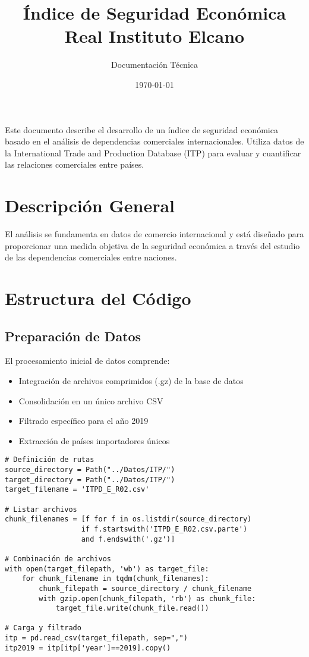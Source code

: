 \documentclass[11pt,a4paper]{article}
\title{\color{titlecolor}\Huge Índice de Seguridad Económica\\[1cm]
       \large Real Instituto Elcano}
\author{\large Documentación Técnica}
\date{\today}
\begin{document}
\maketitle
\thispagestyle{empty}

\begin{tcolorbox}[colback=blue!5,colframe=blue!35,title=Resumen del Proyecto]
Este documento describe el desarrollo de un índice de seguridad económica basado en el análisis de dependencias comerciales internacionales. Utiliza datos de la International Trade and Production Database (ITP) para evaluar y cuantificar las relaciones comerciales entre países.
\end{tcolorbox}

\section{Descripción General}
El análisis se fundamenta en datos de comercio internacional y está diseñado para proporcionar una medida objetiva de la seguridad económica a través del estudio de las dependencias comerciales entre naciones.

\section{Estructura del Código}

\subsection{Preparación de Datos}
El procesamiento inicial de datos comprende:

\begin{itemize}[leftmargin=*]
    \item Integración de archivos comprimidos (.gz) de la base de datos
    \item Consolidación en un único archivo CSV
    \item Filtrado específico para el año 2019
    \item Extracción de países importadores únicos
\end{itemize}

\begin{tcolorbox}[colback=codebackground,title=Código de Preparación]
\begin{lstlisting}
# Definición de rutas
source_directory = Path("../Datos/ITP/")
target_directory = Path("../Datos/ITP/")
target_filename = 'ITPD_E_R02.csv'

# Listar archivos
chunk_filenames = [f for f in os.listdir(source_directory) 
                  if f.startswith('ITPD_E_R02.csv.parte') 
                  and f.endswith('.gz')]

# Combinación de archivos
with open(target_filepath, 'wb') as target_file:
    for chunk_filename in tqdm(chunk_filenames):
        chunk_filepath = source_directory / chunk_filename
        with gzip.open(chunk_filepath, 'rb') as chunk_file:
            target_file.write(chunk_file.read())

# Carga y filtrado
itp = pd.read_csv(target_filepath, sep=",")
itp2019 = itp[itp['year']==2019].copy()
\end{lstlisting}
\end{tcolorbox}
\end{document}
